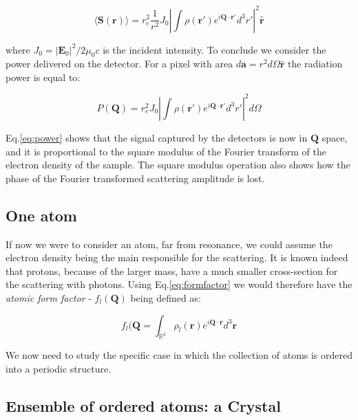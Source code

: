 \begin{equation}
    \langle \mathbf{S(r)} \rangle = r_e^2 \frac{1}{r^2}J_0
    \left| \int \rho(\mathbf{r'}) e^{i \mathbf{Q}\cdot \mathbf{r'}} d^3 r' \right|^2 \mathbf{\hat{r}}
    \label{eq:poynting}
\end{equation}

where $J_0 = \left| \mathbf{E}_0 \right|^2 / 2\mu_0c$ is the incident intensity. 
To conclude we consider the power delivered on the detector. For a pixel with area $d\mathbf a = r^2d\Omega\mathbf{\hat{r}}$ 
the radiation power is equal to: 

\begin{equation}
    P(\mathbf{Q})= r_e^2 J_0
    \left| \int \rho(\mathbf{r'}) e^{i \mathbf{Q}\cdot \mathbf{r'}} d^3 r' \right|^2 d\Omega
    \label{eq:power}
\end{equation}

Eq.\ref{eq:power} shows that the signal captured by the detectors is now in $\mathbf{Q}$ space, and it is proportional 
to the square modulus of the Fourier transform of the electron density of the sample. The square modulus operation also 
shows how the phase of the Fourier transformed scattering amplitude is lost.

\subsection{One atom}

If now we were to consider an atom, far from resonance, we could assume the electron density being the main responsible 
for the scattering. It is known indeed that protons, because of the larger mass, have a much smaller cross-section for the
scattering with photons. 
Using Eq.\ref{eq:formfactor} we would therefore have the \textit{atomic form factor} - $f_l(\mathbf{Q})$ being defined as: 

\begin{equation}
    f_l(\mathbf{Q} = 
   \int_{\mathbb{R}^3} \rho_l(\mathbf r) e^{i \mathbf{Q} \cdot \mathbf{r}}  d^3 \mathbf r
   \label{eq:atomformfactor}
\end{equation} 

We now need to study the specific case in which the collection of atoms is ordered into a periodic structure. 

\subsection{Ensemble of ordered atoms: a Crystal}

